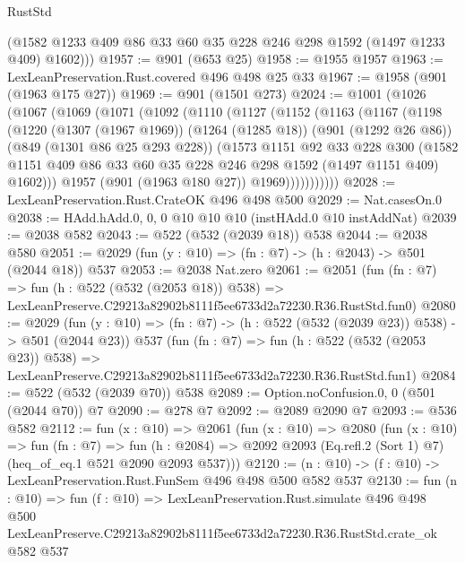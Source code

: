 \begin{lexlean}{RustStd}
\begin{coremodule}
        (@1582 @1233 @409 @86 @33 @60 @35 @228 @246 @298 @1592 (@1497 @1233 @409) @1602)))
@1957 := @901 (@653 @25)
@1958 := @1955 @1957
@1963 := LexLeanPreservation.Rust.covered @496 @498 @25 @33
@1967 := @1958 (@901 (@1963 @175 @27))
@1969 := @901 (@1501 @273)
@2024 := @1001
    (@1026
      (@1067
        (@1069
          (@1071
            (@1092
              (@1110
                (@1127
                  (@1152
                    (@1163
                      (@1167
                        (@1198
                          (@1220
                            (@1307 (@1967 @1969))
                            (@1264 (@1285 @18))
                            (@901 (@1292 @26 @86))
                            (@849 (@1301 @86 @25 @293 @228))
                            (@1573
                              @1151
                              @92
                              @33
                              @228
                              @300
                              (@1582
                                @1151
                                @409
                                @86
                                @33
                                @60
                                @35
                                @228
                                @246
                                @298
                                @1592
                                (@1497 @1151 @409)
                                @1602)))
                          @1957
                          (@901 (@1963 @180 @27))
                          @1969)))))))))))
@2028 := LexLeanPreservation.Rust.CrateOK @496 @498 @500
@2029 := Nat.casesOn.{0}
@2038 := HAdd.hAdd.{0, 0, 0} @10 @10 @10 (instHAdd.{0} @10 instAddNat)
@2039 := @2038 @582
@2043 := @522 (@532 (@2039 @18)) @538
@2044 := @2038 @580
@2051 := @2029 (fun (y : @10) => (fn : @7) -> (h : @2043) -> @501 (@2044 @18)) @537
@2053 := @2038 Nat.zero
@2061 := @2051
    (fun (fn : @7) =>
    fun (h : @522 (@532 (@2053 @18)) @538) =>
    LexLeanPreserve.C29213a82902b8111f5ee6733d2a72230.R36.RustStd.fun0)
@2080 := @2029
    (fun (y : @10) => (fn : @7) -> (h : @522 (@532 (@2039 @23)) @538) -> @501 (@2044 @23))
    @537
    (fun (fn : @7) =>
    fun (h : @522 (@532 (@2053 @23)) @538) =>
    LexLeanPreserve.C29213a82902b8111f5ee6733d2a72230.R36.RustStd.fun1)
@2084 := @522 (@532 (@2039 @70)) @538
@2089 := Option.noConfusion.{0, 0} (@501 (@2044 @70)) @7
@2090 := @278 @7
@2092 := @2089 @2090 @7
@2093 := @536 @582
@2112 := fun (x : @10) =>
  @2061
    (fun (x : @10) =>
    @2080
      (fun (x : @10) =>
      fun (fn : @7) =>
      fun (h : @2084) =>
      @2092 @2093 (Eq.refl.{2} (Sort 1) @7) (heq_of_eq.{1} @521 @2090 @2093 @537)))
@2120 := (n : @10) -> (f : @10) -> LexLeanPreservation.Rust.FunSem @496 @498 @500 @582 @537
@2130 := fun (n : @10) =>
  fun (f : @10) =>
  LexLeanPreservation.Rust.simulate
    @496
    @498
    @500
    LexLeanPreserve.C29213a82902b8111f5ee6733d2a72230.R36.RustStd.crate_ok
    @582
    @537
\end{coremodule}
\end{lexlean}
